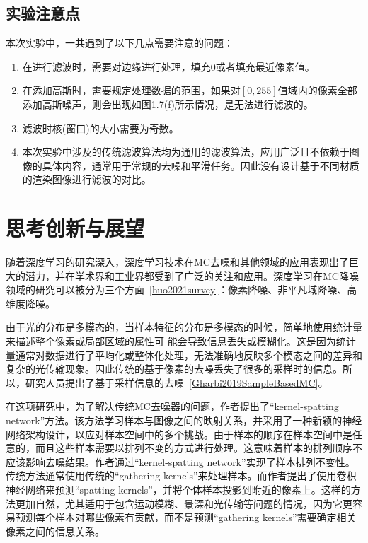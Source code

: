 \documentclass[lang=cn,10pt]{elegantbook}
\begin{document}
\section{实验注意点}
本次实验中，一共遇到了以下几点需要注意的问题：

\vspace{5pt}
\begin{enumerate}[itemsep=1.5ex]
\item 在进行滤波时，需要对边缘进行处理，填充0或者填充最近像素值。
\item 在添加高斯时，需要规定处理数据的范围，如果对$[0,255]$值域内的像素全部添加高斯噪声，则会出现如图1.7(f)所示情况，是无法进行滤波的。

\item 滤波时核(窗口)的大小需要为奇数。

\item 本次实验中涉及的传统滤波算法均为通用的滤波算法，应用广泛且不依赖于图像的具体内容，通常用于常规的去噪和平滑任务。因此没有设计基于不同材质的渲染图像进行滤波的对比。

\end{enumerate}


\chapter{思考创新与展望}
随着深度学习的研究深入，深度学习技术在MC去噪和其他领域的应用表现出了巨大的潜力，并在学术界和工业界都受到了广泛的关注和应用。深度学习在MC降噪领域的研究可以被分为三个方面~\ref{huo2021survey}：像素降噪、非平凡域降噪、高维度降噪。

由于光的分布是多模态的，当样本特征的分布是多模态的时候，简单地使用统计量来描述整个像素或局部区域的属性可
能会导致信息丢失或模糊化。这是因为统计量通常对数据进行了平均化或整体化处理，无法准确地反映多个模态之间的差异和复杂的光传输现象。因此传统的基于像素的去噪丢失了很多的采样时的信息。所以，研究人员提出了基于采样信息的去噪~\ref{Gharbi2019SampleBasedMC}。

在这项研究中，为了解决传统MC去噪器的问题，作者提出了“kernel-spatting network”方法。该方法学习样本与图像之间的映射关系，并采用了一种新颖的神经网络架构设计，以应对样本空间中的多个挑战。由于样本的顺序在样本空间中是任意的，而且这些样本需要以排列不变的方式进行处理。这意味着样本的排列顺序不应该影响去噪结果。作者通过“kernel-spatting network”实现了样本排列不变性。传统方法通常使用传统的“gathering kernels”来处理样本。而作者提出了使用卷积神经网络来预测“spatting kernels”，并将个体样本投影到附近的像素上。这样的方法更加自然，尤其适用于包含运动模糊、景深和光传输等问题的情况，因为它更容易预测每个样本对哪些像素有贡献，而不是预测“gathering kernels”需要确定相关像素之间的信息关系。
\end{document}
